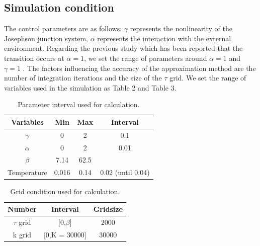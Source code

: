 \documentclass{article}[12pt]
\begin{document}
\begin{spacing}{1.5}
\subsection{Simulation condition}
The control parameters are as follows: $\gamma$ represents the nonlinearity of the Josephson junction system, 
$\alpha$ represents the interaction with the external environment. Regarding the previous study which has been reported 
that the transition occurs at $\alpha = 1$, we set the range of parameters around $\alpha = 1$ and $\gamma = 1$ . 
The factors influencing the accuracy of the approximation method are the number of integration iterations and the size of the $\tau$ grid. 
We set the range of variables used in the simulation as Table 2 and Table 3.
\begin{table}[htbp]
  \centering
  \renewcommand{\arraystretch}{1.2}  %
  \begin{tabular}{@{}cccc@{}}
  \toprule
  \textbf{Variables} & \textbf{Min} & \textbf{Max}  & \textbf{Interval}\\ 
  \midrule
  $\gamma$ & 0 & 2 & 0.1 \\
  $\alpha$ & 0 & 2 & 0.01 \\
  $\beta$ & 7.14 & 62.5 &  \\
  Temperature & 0.016 & 0.14 & 0.02 (until 0.04) \\
  \bottomrule
  \end{tabular}
  \caption{Parameter interval used for calculation.}
  \end{table}
\begin{table}[htbp]
  \centering
  \renewcommand{\arraystretch}{1.2}  %
  \begin{tabular}{@{}ccc@{}}
  \toprule
  \textbf{Number} & \textbf{Interval} & \textbf{Gridsize}\\ 
  \midrule
  $\tau$ grid & [0,$\beta$] & 2000 \\
  k grid & [0,K = 30000] & 30000 \\
  \bottomrule
  \end{tabular}
  \caption{Grid condition used for calculation.}
  \end{table}

\end{spacing}
\end{document}
